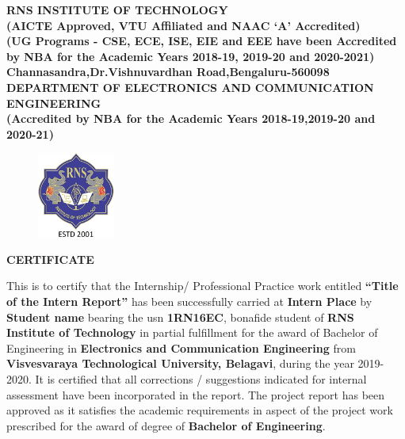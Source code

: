 %
\setlength{\toptafiddle}{1in}
\setlength{\bottafiddle}{1in}
\vspace*{-0.4in}
\enlargethispage{\bottafiddle}
\thispagestyle{empty}


\begin{center}
\small\textbf{{\color{blue}	RNS INSTITUTE OF TECHNOLOGY\\
(AICTE Approved, VTU Affiliated and NAAC `A' Accredited)\\
(UG Programs - CSE, ECE, ISE, EIE and EEE have been Accredited by NBA for the Academic Years 2018-19, 2019-20 and 2020-2021)\\
Channasandra,Dr.Vishnuvardhan Road,Bengaluru-560098}\\
\vspace{0.3cm}
DEPARTMENT OF ELECTRONICS AND COMMUNICATION ENGINEERING\\
(Accredited by NBA for the Academic Years 2018-19,2019-20 and 2020-21)
}
\end{center}

\begin{center}
\begin{figure}[h]
\centering
\includegraphics[height=2.8cm]{images/rns1.jpg}
\end{figure}
\Large{\textbf{CERTIFICATE}}
\end{center}

This is to certify that the Internship/ Professional Practice work entitled \textbf{``Title of the Intern Report''} has been successfully carried at \textbf{Intern Place} by \textbf{Student name} bearing the usn \textbf{1RN16EC}, bonafide student of \textbf{\color{blue}RNS Institute of Technology} in partial fulfillment for the award of Bachelor of Engineering in \textbf{\color{blue}Electronics and Communication Engineering} from \textbf{\color{blue}Visvesvaraya Technological University, Belagavi}, during the year 2019-2020. It is certified that all corrections / suggestions indicated for internal assessment have been incorporated in the report. The project report has been approved as it satisfies the academic requirements in aspect of the project work prescribed for the award of degree of \textbf{\color{blue}Bachelor of Engineering}.


